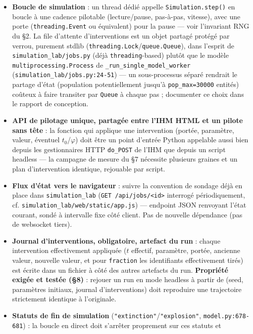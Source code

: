 \documentclass[11pt,a4paper]{article}
\newcommand{\code}[1]{\texttt{#1}}
\begin{document}
\begin{itemize}
\item \textbf{Boucle de simulation} : un thread dédié appelle
  \code{Simulation.step()} en boucle à une cadence pilotable
  (lecture/pause, pas-à-pas, vitesse), avec une porte
  (\code{threading.Event} ou équivalent) pour la pause --- voir
  l'invariant RNG du \S2. La file d'attente d'interventions est un objet
  partagé protégé par verrou, purement stdlib
  (\code{threading.Lock}/\code{queue.Queue}), dans l'esprit de
  \code{simulation\_lab/jobs.py} (déjà \code{threading}-based) plutôt que
  le modèle \code{multiprocessing.Process} de
  \code{\_run\_single\_model\_worker} (\code{simulation\_lab/jobs.py:24-51})
  --- un sous-processus séparé rendrait le partage d'état (population
  potentiellement jusqu'à \code{pop\_max=30000} entités) coûteux à faire
  transiter par \code{Queue} à chaque pas ; documenter ce choix dans le
  rapport de conception.
\item \textbf{API de pilotage unique, partagée entre l'IHM HTML et un
  pilote sans tête} : la fonction qui applique une intervention (portée,
  paramètre, valeur, éventuel $t_0$/$\varphi$) doit être un point
  d'entrée Python appelable aussi bien depuis les gestionnaires HTTP
  \code{do\_POST} de l'IHM que depuis un script headless --- la campagne
  de mesure du \S7 nécessite plusieurs graines et un plan d'intervention
  identique, rejouable par script.
\item \textbf{Flux d'état vers le navigateur} : suivre la convention de
  sondage déjà en place dans \code{simulation\_lab}
  (\code{GET /api/jobs/<id>} interrogé périodiquement, cf.
  \code{simulation\_lab/web/static/app.js}) --- endpoint JSON renvoyant
  l'état courant, sondé à intervalle fixe côté client. Pas de nouvelle
  dépendance (pas de websocket tiers).
\item \textbf{Journal d'interventions, obligatoire, artefact du run} :
  chaque intervention effectivement appliquée ($t$ effectif, paramètre,
  portée, ancienne valeur, nouvelle valeur, et pour \code{fraction} les
  identifiants effectivement tirés) est écrite dans un fichier à côté
  des autres artefacts du run. \textbf{Propriété exigée et testée
  (\S8)} : rejouer un run en mode headless à partir de (seed, paramètres
  initiaux, journal d'interventions) doit reproduire une trajectoire
  strictement identique à l'originale.
\item \textbf{Statuts de fin de simulation}
  (\code{"extinction"}/\code{"explosion"}, \code{model.py:678-681}) : la
  boucle en direct doit s'arrêter proprement sur ces statuts et

\end{itemize}
\end{document}
